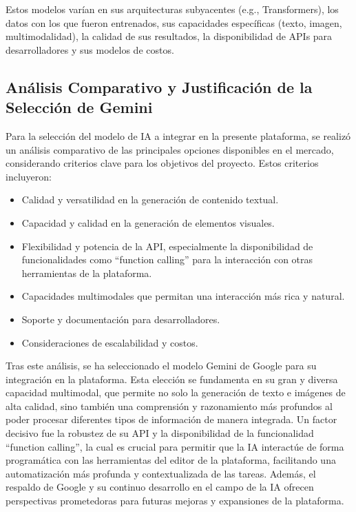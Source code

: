 \documentclass[12pt,a4paper]{report}
\begin{document}
Estos modelos varían en sus arquitecturas subyacentes (e.g., Transformers), los datos con los que fueron entrenados, sus capacidades específicas (texto, imagen, multimodalidad), la calidad de sus resultados, la disponibilidad de APIs para desarrolladores y sus modelos de costos.

\subsection{Análisis Comparativo y Justificación de la Selección de Gemini}

Para la selección del modelo de IA a integrar en la presente plataforma, se realizó un análisis comparativo de las principales opciones disponibles en el mercado, considerando criterios clave para los objetivos del proyecto. Estos criterios incluyeron:

\begin{itemize}
\item Calidad y versatilidad en la generación de contenido textual.
\item Capacidad y calidad en la generación de elementos visuales.
\item Flexibilidad y potencia de la API, especialmente la disponibilidad de funcionalidades como ``function calling'' para la interacción con otras herramientas de la plataforma.
\item Capacidades multimodales que permitan una interacción más rica y natural.
\item Soporte y documentación para desarrolladores.
\item Consideraciones de escalabilidad y costos.
\end{itemize}

Tras este análisis, se ha seleccionado el modelo Gemini de Google para su integración en la plataforma. Esta elección se fundamenta en su gran y diversa capacidad multimodal, que permite no solo la generación de texto e imágenes de alta calidad, sino también una comprensión y razonamiento más profundos al poder procesar diferentes tipos de información de manera integrada. Un factor decisivo fue la robustez de su API y la disponibilidad de la funcionalidad ``function calling'', la cual es crucial para permitir que la IA interactúe de forma programática con las herramientas del editor de la plataforma, facilitando una automatización más profunda y contextualizada de las tareas. Además, el respaldo de Google y su continuo desarrollo en el campo de la IA ofrecen perspectivas prometedoras para futuras mejoras y expansiones de la plataforma.
\end{document}

